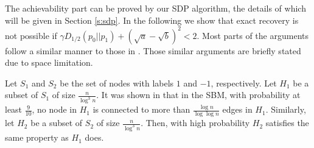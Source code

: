 \documentclass[conference]{IEEEtran}
\begin{document}
%		
		The achievability part can be proved by our SDP algorithm, the details of which will be given in  Section \ref{s:sdp}.
		In the following we show that exact recovery is not possible if $\gamma D_{1/2}(p_0||p_1) + (\sqrt{a} - \sqrt{b})^2 < 2$. Most parts of the arguments follow a similar manner to those in \cite{abbe2015exact}. Those similar arguments are briefly stated due to space limitation. 
		
		Let $S_1$ and $S_2$ be the set of nodes with labels $1$ and $-1$, respectively. Let $H_1$ be a subset of $S_1$ of size $\frac{n}{\log^3 n}$. It was shown in \cite{abbe2015exact} that in the SBM, with probability at least $\frac{9}{10}$, no node in $H_1$ is connected to more than $\frac{\log n}{\log\log n}$ edges in $H_1$. Similarly, let $H_2$ be a subset of $S_2$ of size $\frac{n}{\log^3 n}$. Then, with high probability $H_2$ satisfies the same property as $H_1$ does. 
		
\end{document}
